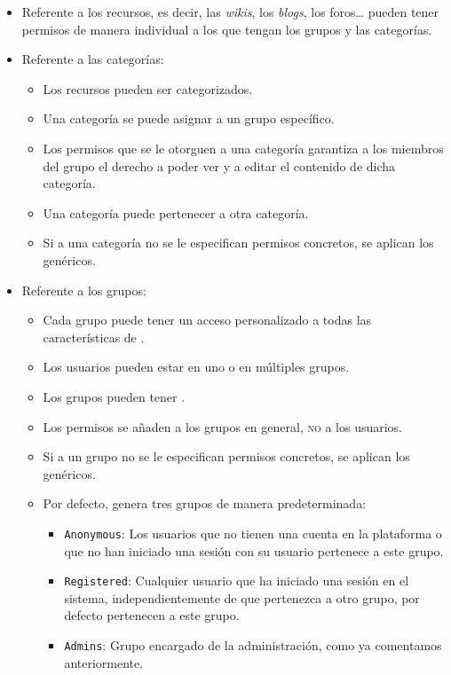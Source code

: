 \begin{itemize}
\item Referente a los recursos, es decir, las \textit{wikis}, los \textit{blogs}, los foros\ldots{} pueden tener permisos de manera individual a los que tengan los grupos y las categorías.   
\item Referente a las categorías:
      \begin{itemize}
      \item Los recursos pueden ser categorizados.
      \item Una categoría se puede asignar a un grupo específico.
      \item Los permisos que se le otorguen a una categoría garantiza a los miembros del grupo el derecho a poder ver y a editar el contenido de dicha categoría.
      \item Una categoría puede pertenecer a otra categoría.
      \item Si a una categoría no se le especifican permisos concretos, se aplican los genéricos.
      \end{itemize}
  \item Referente a los grupos:
      \begin{itemize}
       \item Cada grupo puede tener un acceso personalizado a todas las características de \tiki{}.
       \item Los usuarios pueden estar en uno o en múltiples grupos.
       \item Los grupos pueden tener .
       \item Los permisos se añaden a los grupos en general, \textsc{no} a los usuarios.
        \item Si a un grupo no se le especifican permisos concretos, se aplican los genéricos.
        \item Por defecto, \tiki{} genera tres grupos de manera predeterminada:
          \begin{itemize}
            \item \texttt{Anonymous}: Los usuarios que no tienen una cuenta en la plataforma o que no han iniciado una sesión con su usuario pertenece a este grupo.
            \item \texttt{Registered}: Cualquier usuario que ha iniciado una sesión en el sistema, independientemente de que pertenezca a otro grupo, por defecto pertenecen a este grupo.
            \item \texttt{Admins}: Grupo encargado de la administración, como ya comentamos anteriormente. 
          \end{itemize}
      \end{itemize}
\end{itemize}

